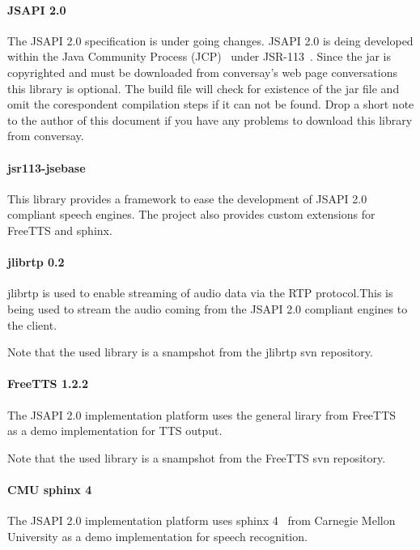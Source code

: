 \documentclass[11pt,a4paper]{article}
\begin{document}
\paragraph{JSAPI 2.0}

The JSAPI 2.0 specification is under going changes.
JSAPI 2.0 is deing developed within
the Java Community Process (JCP)~\cite{jcp} under 
JSR-113~\cite{jcp:jsr113}. Since the jar is copyrighted and must be downloaded
from conversay's web page conversations~\cite{conversay:jsr113}
this library is optional. The
build file will check for existence of the jar file and omit the corespondent 
compilation steps if it can not be found. Drop a short note to the author of
this document if you have any problems to download this library from conversay.

\paragraph{jsr113-jsebase}

This library provides a framework to ease the development of JSAPI 2.0
compliant speech engines. The project also provides custom extensions for
FreeTTS and sphinx.

\paragraph{jlibrtp 0.2}

jlibrtp is used to enable streaming of audio data via the RTP protocol.This
is being used to stream the audio coming from the JSAPI 2.0 compliant
engines to the client.

Note that the used library is a snampshot from the jlibrtp svn repository.

\paragraph{FreeTTS 1.2.2}

The JSAPI 2.0 implementation platform uses the general lirary from
FreeTTS~\cite{freetts} as a demo implementation for TTS output.

Note that the used library is a snampshot from the FreeTTS svn repository.

\paragraph{CMU sphinx 4}
\label{sec:sphinx}

The JSAPI 2.0 implementation platform uses sphinx 4~\cite{sphinx} from
Carnegie Mellon University as a demo implementation for speech recognition.
\end{document}
